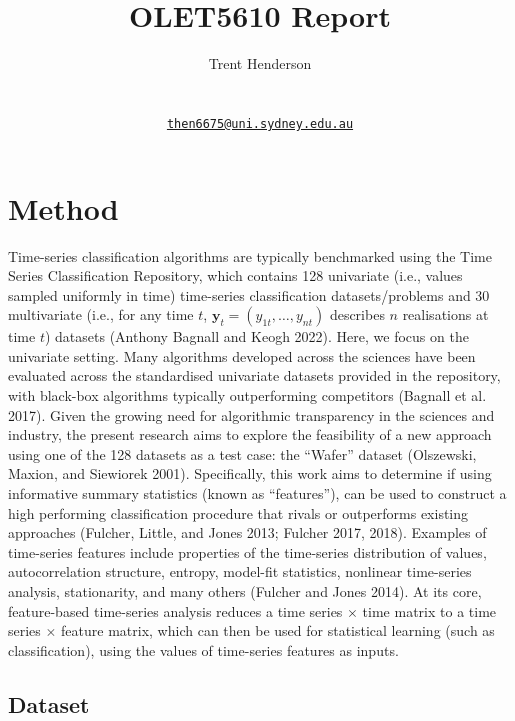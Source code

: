 \documentclass{article}
\title{OLET5610 Report}
\author{
    Trent Henderson
   \\
     \\
   \\
  \texttt{\href{mailto:then6675@uni.sydney.edu.au}{\nolinkurl{then6675@uni.sydney.edu.au}}} \\
  }
\renewenvironment{abstract}{}{}
\begin{document}
\maketitle

\def\tightlist{}


\begin{abstract}

\end{abstract}


\hypertarget{method}{%
\section{Method}\label{method}}

Time-series classification algorithms are typically benchmarked using the Time Series Classification Repository, which contains 128 univariate (i.e., values sampled uniformly in time) time-series classification datasets/problems and 30 multivariate (i.e., for any time \(t\), \(\mathbf{y}_{t} = (y_{1t},\ldots, y_{nt})\) describes \(n\) realisations at time \(t\)) datasets (Anthony Bagnall and Keogh 2022). Here, we focus on the univariate setting. Many algorithms developed across the sciences have been evaluated across the standardised univariate datasets provided in the repository, with black-box algorithms typically outperforming competitors (Bagnall et al. 2017). Given the growing need for algorithmic transparency in the sciences and industry, the present research aims to explore the feasibility of a new approach using one of the 128 datasets as a test case: the ``Wafer'' dataset (Olszewski, Maxion, and Siewiorek 2001). Specifically, this work aims to determine if using informative summary statistics (known as ``features''), can be used to construct a high performing classification procedure that rivals or outperforms existing approaches (Fulcher, Little, and Jones 2013; Fulcher 2017, 2018). Examples of time-series features include properties of the time-series distribution of values, autocorrelation structure, entropy, model-fit statistics, nonlinear time-series analysis, stationarity, and many others (Fulcher and Jones 2014). At its core, feature-based time-series analysis reduces a time series \(\times\) time matrix to a time series \(\times\) feature matrix, which can then be used for statistical learning (such as classification), using the values of time-series features as inputs.

\hypertarget{dataset}{%
\subsection{Dataset}\label{dataset}}
\end{document}

